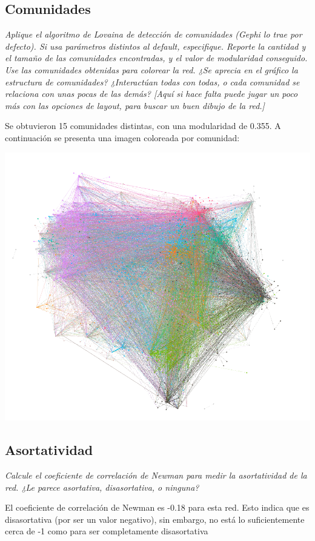 \documentclass[12pt]{article}
\begin{document}
\subsection{Comunidades} 
\textit{Aplique el algoritmo de Lovaina de detección de comunidades (Gephi lo trae por defecto). Si usa parámetros distintos al default, especifique. Reporte la cantidad y el tamaño de las comunidades encontradas, y el valor de modularidad conseguido. Use las comunidades obtenidas para colorear la red. ¿Se aprecia en el gráfico la estructura de comunidades? ¿Interactúan todas con todas, o cada comunidad se relaciona con unas pocas de las demás? [Aquí si hace falta puede jugar un poco más con las opciones de layout, para buscar un buen dibujo de la red.]}

Se obtuvieron 15 comunidades distintas, con una modularidad de 0.355. A continuación se presenta una imagen coloreada por comunidad:

\begin{center}
    \includegraphics[scale=0.4]{images/red_comunidades.png}
\end{center}
\subsection{Asortatividad}
\textit{Calcule el coeficiente de correlación de Newman para medir la asortatividad de la red. ¿Le parece asortativa, disasortativa, o ninguna?}

El coeficiente de correlación de Newman es -0.18 para esta red. Esto indica que es disasortativa (por ser un valor negativo), sin embargo, no está lo suficientemente cerca de -1 como para ser completamente disasortativa
\end{document}
